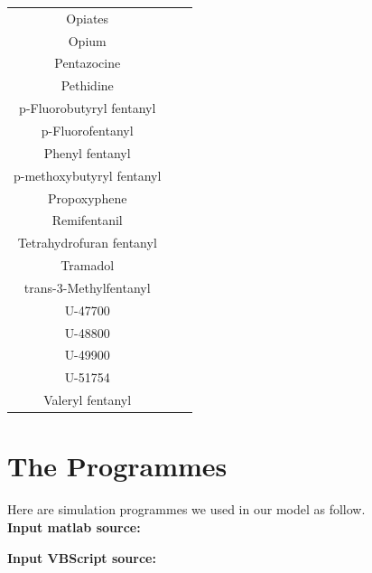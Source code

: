 \documentclass[12pt]{mcmthesis}
\begin{document}
\begin{appendices}
\begin{longtable}{|c|c|c|}
Opiates                       &                      &        \\
Opium                         &                      &        \\
Pentazocine                   &                      &        \\
Pethidine                     &                      &        \\
p-Fluorobutyryl fentanyl      &                      &        \\
p-Fluorofentanyl              &                      &        \\
Phenyl fentanyl               &                      &        \\
p-methoxybutyryl fentanyl     &                      &        \\
Propoxyphene                  &                      &        \\
Remifentanil                  &                      &        \\
Tetrahydrofuran fentanyl      &                      &        \\
Tramadol                      &                      &        \\
trans-3-Methylfentanyl        &                      &        \\
U-47700                       &                      &        \\
U-48800                       &                      &        \\
U-49900                       &                      &        \\
U-51754                       &                      &        \\
Valeryl fentanyl              &                      &        \\
\hline
\end{longtable}
\newpage
\section{The Programmes}
Here are simulation programmes we used in our model as follow.\\

\textbf{\textcolor[rgb]{0.98,0.00,0.00}{Input matlab source:}}



\textcolor[rgb]{0.98,0.00,0.00}{\textbf{Input VBScript source:}}


\end{appendices}
\end{document}
